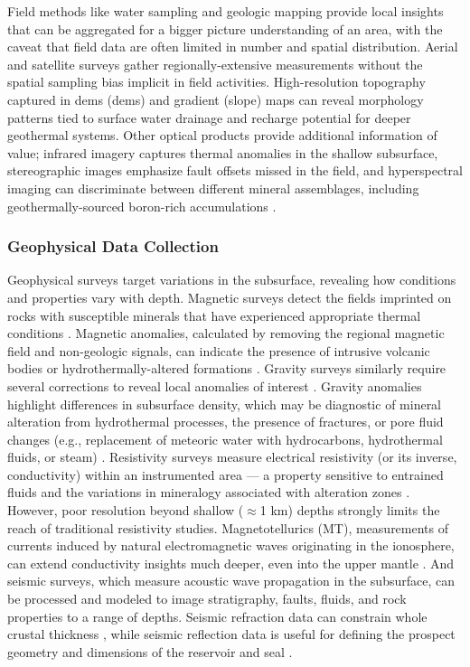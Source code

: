 Field methods like water sampling and geologic mapping provide local insights that can be aggregated for a bigger picture understanding of an area, with the caveat that field data are often limited in number and spatial distribution. Aerial and satellite surveys gather regionally-extensive measurements without the spatial sampling bias implicit in field activities. High-resolution topography captured in \acrlong{dem}s (\acrshort{dem}s) and gradient (slope) maps can reveal morphology patterns tied to surface water drainage and recharge potential for deeper geothermal systems. Other optical products provide additional information of value; infrared imagery captures thermal anomalies in the shallow subsurface, stereographic images emphasize fault offsets missed in the field, and hyperspectral imaging can discriminate between different mineral assemblages, including geothermally-sourced boron-rich accumulations .

\subsubsection{Geophysical Data Collection}\label{ch2:geophysical_data}
Geophysical surveys target variations in the subsurface, revealing how conditions and properties vary with depth. Magnetic surveys detect the fields imprinted on rocks with susceptible minerals that have experienced appropriate thermal conditions \citep[p.\ 248-249]{lowrie_fundamentals_2007}. Magnetic anomalies, calculated by removing the regional magnetic field and non-geologic signals, can indicate the presence of intrusive volcanic bodies or hydrothermally-altered formations \citep[p.\ 146]{glassley_geothermal_2015}. Gravity surveys similarly require several corrections to reveal local anomalies of interest \citep[p.\ 59-62]{lowrie_fundamentals_2007}. Gravity anomalies highlight differences in subsurface density, which may be diagnostic of mineral alteration from hydrothermal processes, the presence of fractures, or pore fluid changes (e.g., replacement of meteoric water with hydrocarbons, hydrothermal fluids, or steam) \citep[p.\ 150]{glassley_geothermal_2015}. Resistivity surveys measure electrical resistivity (or its inverse, conductivity) within an instrumented area --– a property sensitive to entrained fluids and the variations in mineralogy associated with alteration zones \citep[p.\ 147]{glassley_geothermal_2015}. However, poor resolution beyond shallow ($\approx$1 km) depths strongly limits the reach of traditional resistivity studies. Magnetotellurics (MT), measurements of currents induced by natural electromagnetic waves originating in the ionosphere, can extend conductivity insights much deeper, even into the upper mantle \citep[p.\ 225]{lowrie_fundamentals_2007}. And seismic surveys, which measure acoustic wave propagation in the subsurface, can be processed and modeled to image stratigraphy, faults, fluids, and rock properties to a range of depths. Seismic refraction data can constrain whole crustal thickness \citep[e.g.][]{holmes_oceanic_2009}, while seismic reflection data is useful for defining the prospect geometry and dimensions of the reservoir and seal \citep[e.g.][]{cappetti_new_2005}.

